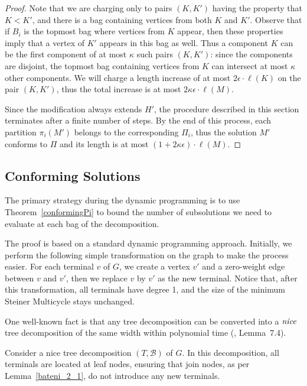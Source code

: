 \begin{proof}
Note that we are charging only to pairs \((K, K')\) having the property that \(K < K'\), and there is a bag containing vertices from both \(K\) and \(K'\). Observe that if \(B_i\) is the topmost bag where vertices from \(K\) appear, then these properties imply that a vertex of \(K'\) appears in this bag as well. Thus a component \(K\) can be the first component of at most \(\kappa\) such pairs \((K, K')\): since the components are disjoint, the topmost bag containing vertices from \(K\) can intersect at most \(\kappa\) other components. We will charge a length increase of at most \(2 \epsilon \cdot \ell(K)\) on the pair \((K, K')\), thus the total increase is at most \(2\kappa\epsilon \cdot \ell(M)\).

Since the modification always extends \(H'\), the procedure described in this section terminates after a finite number of steps. By the end of this process, each partition \(\pi_i(M')\) belongs to the corresponding \(\Pi_i\), thus the solution \(M'\) conforms to \(\Pi\) and its length is at most \((1 + 2\kappa\epsilon) \cdot \ell(M)\).
\end{proof}

\subsection{Conforming Solutions}

The primary strategy during the dynamic programming is to use Theorem~\ref{conformingPi} to bound the number of subsolutions we need to evaluate at each bag of the decomposition.

The proof is based on a standard dynamic programming approach. Initially, we perform the following simple transformation on the graph to make the process easier. 
For each terminal \(v\) of \(G\), we create a vertex \(v'\) and a zero-weight edge between \(v\) and \(v'\), then we replace \(v\) by \(v'\) as the new terminal. Notice that, after this transformation, all terminals have degree 1, and the size of the minimum Steiner Multicycle stays unchanged.

One well-known fact is that any tree decomposition can be converted into a \(\emph{nice}\) tree decomposition of the same width within polynomial time (\cite{CyganBook}, Lemma~7.4). 

Consider a nice tree decomposition $(T, \mathcal{B})$ of $G$. In this decomposition, all terminals are located at leaf nodes, ensuring that join nodes, as per Lemma~\ref{bateni_2_1}, do not introduce any new terminals.

